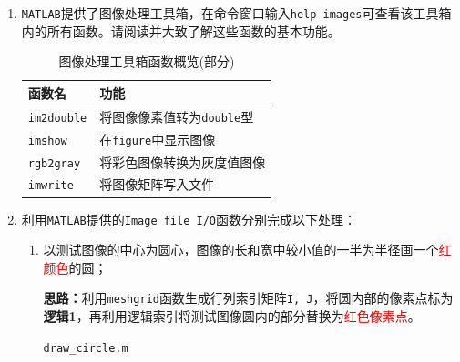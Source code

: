 \documentclass{article}
\numberwithin{figure}{section}
\numberwithin{table}{section}
\numberwithin{listing}{section}
\begin{document}
        \begin{enumerate}
            \item \texttt{MATLAB}提供了图像处理工具箱，在命令窗口输入\texttt{help images}可查看该工具箱内的所有函数。请阅读并大致了解这些函数的基本功能。

                \begin{table}[H]
                    \caption{图像处理工具箱函数概览(部分)}
                    \label{tab:help_images}
                    \centering
                
                    \begin{tabular}{l|l}
                    \hline
                
                    \hline
                    \textbf{函数名} & \textbf{功能} \\
                    \hline
                        \texttt{im2double} & 将图像像素值转为\texttt{double}型 \\
                    \hline
                        \texttt{imshow} & 在\texttt{figure}中显示图像 \\
                    \hline
                        \texttt{rgb2gray} & 将彩色图像转换为灰度值图像 \\
                    \hline
                        \texttt{imwrite} & 将图像矩阵写入文件 \\
                
                    \hline
                    \end{tabular}
                \end{table}

            \item 利用\texttt{MATLAB}提供的\texttt{Image file I/O}函数分别完成以下处理：
                \begin{enumerate}
                    \item 以测试图像的中心为圆心，图像的长和宽中较小值的一半为半径画一个\textcolor{red}{红颜色}的圆；

                        \textbf{思路：}利用\texttt{meshgrid}函数生成行列索引矩阵\texttt{I, J}，将圆内部的像素点标为\textbf{逻辑1}，再利用逻辑索引将测试图像圆内的部分替换为\textcolor{red}{红色像素点}。

                        \begin{listing}[H]
                            \caption{\texttt{draw\_circle.m}}
                            \label{listing:draw_circle}
                            \inputminted[bgcolor=bg, linenos, fontsize=\footnotesize]{matlab}{../draw_circle.m}
                        \end{listing}


\end{enumerate}
\end{enumerate}
\end{document}
